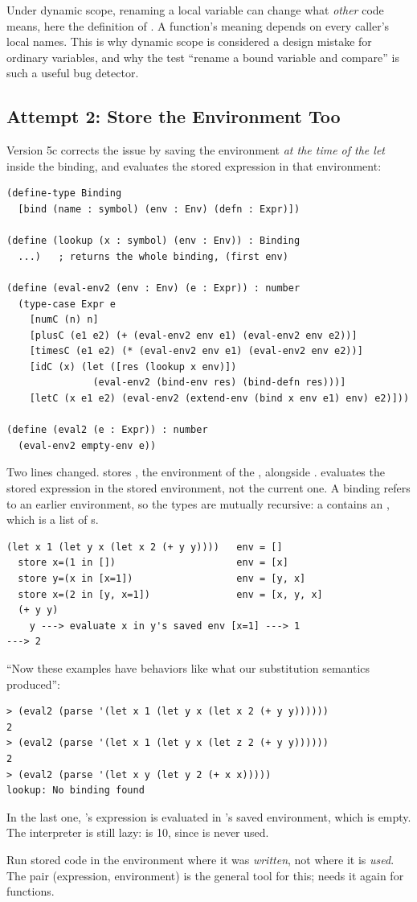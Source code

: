 \begin{pitfall}
Under dynamic scope, renaming a local variable can change what \emph{other} code means, here the definition of . A function's meaning depends on every caller's local names. This is why dynamic scope is considered a design mistake for ordinary variables, and why the test ``rename a bound variable and compare'' is such a useful bug detector.
\end{pitfall}

\subsection{Attempt 2: Store the Environment Too}

Version 5c corrects the issue by saving the environment \emph{at the time of the let} inside the binding, and evaluates the stored expression in that environment:
\begin{lstlisting}
(define-type Binding
  [bind (name : symbol) (env : Env) (defn : Expr)])

(define (lookup (x : symbol) (env : Env)) : Binding
  ...)   ; returns the whole binding, (first env)

(define (eval-env2 (env : Env) (e : Expr)) : number
  (type-case Expr e
    [numC (n) n]
    [plusC (e1 e2) (+ (eval-env2 env e1) (eval-env2 env e2))]
    [timesC (e1 e2) (* (eval-env2 env e1) (eval-env2 env e2))]
    [idC (x) (let ([res (lookup x env)])
               (eval-env2 (bind-env res) (bind-defn res)))]
    [letC (x e1 e2) (eval-env2 (extend-env (bind x env e1) env) e2)]))

(define (eval2 (e : Expr)) : number
  (eval-env2 empty-env e))
\end{lstlisting}
Two lines changed.  stores , the environment of the , alongside .  evaluates the stored expression in the stored environment, not the current one. A binding refers to an earlier environment, so the types are mutually recursive: a  contains an , which is a list of s.

\begin{lstlisting}[style=repl]
(let x 1 (let y x (let x 2 (+ y y))))   env = []
  store x=(1 in [])                     env = [x]
  store y=(x in [x=1])                  env = [y, x]
  store x=(2 in [y, x=1])               env = [x, y, x]
  (+ y y)
    y ---> evaluate x in y's saved env [x=1] ---> 1
---> 2
\end{lstlisting}
``Now these examples have behaviors like what our substitution semantics produced'':
\begin{lstlisting}[style=repl]
> (eval2 (parse '(let x 1 (let y x (let x 2 (+ y y))))))
2
> (eval2 (parse '(let x 1 (let y x (let z 2 (+ y y))))))
2
> (eval2 (parse '(let x y (let y 2 (+ x x)))))
lookup: No binding found
\end{lstlisting}
In the last one, 's expression  is evaluated in 's saved environment, which is empty. The interpreter is still lazy:  is 10, since  is never used.

\begin{keypoint}
Run stored code in the environment where it was \emph{written}, not where it is \emph{used}. The pair (expression, environment) is the general tool for this;  needs it again for functions.
\end{keypoint}

